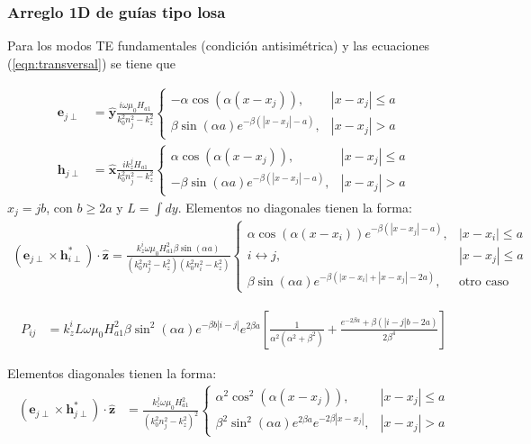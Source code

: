 \subsubsection{Arreglo 1D de guías tipo losa}
Para los modos TE fundamentales (condición antisimétrica) y las ecuaciones (\ref{eqn:transversal}) se tiene que

\begin{align}
	\textbf{e}_{j\perp} &= \hat{\textbf{y}}\frac{i\omega\mu_0 H_{a1}}{k_0^2n_j^2 - k_z^2}\left\{ \begin{matrix}
-\alpha \cos(\alpha (x-x_j)), &|x-x_j|\le a
\\
\beta\sin(\alpha a) e^{-\beta(|x-x_j|-a)}, &|x-x_j| > a
\end{matrix}\right.
\\
\textbf{h}_{j\perp} &= \hat{\textbf{x}}\frac{ik_z^j H_{a1}}{k_0^2n_j^2 - k_z^2}\left\{ \begin{matrix}
\alpha \cos(\alpha (x-x_j)), &|x-x_j|\le a
\\
-\beta\sin(\alpha a) e^{-\beta(|x-x_j|-a)}, &|x-x_j| > a
\end{matrix}\right.
\end{align}
$x_j=jb$, con $b\ge 2a$ y $L=\int dy$. Elementos no diagonales tienen la forma:
\begin{align}
	\left(\textbf{e}_{j\perp}\times\textbf{h}_{i\perp}^*\right)\cdot \hat{\textbf{z}}
	=
	\frac{k_z^i \omega \mu_0 H_{a1}^2 \beta\sin(\alpha a)}{(k_0^2n_j^2 - k_z^2)(k_0^2n_i^2 - k_z^2)}
	\left\{
	\begin{matrix}
		 \alpha\cos(\alpha(x-x_i))e^{-\beta(|x-x_j|-a)}, & |x-x_i| \le a
		\\
		i \leftrightarrow j, & |x-x_j| \le a
		\\
		\beta \sin(\alpha a)e^{-\beta (|x-x_i|+|x-x_j|-2a)}, & \text{otro caso}
	\end{matrix}
	\right.
\end{align}

\begin{align*}
	P_{ij} &= k_z^i L \omega \mu_0 H_{a1}^2 \beta\sin^2(\alpha a)e^{-\beta b |i-j|} e^{2\beta a} \left[\frac{1}{\alpha^2(\alpha^2+\beta^2)} + \frac{e^{-2\beta a}+\beta\left(|i-j|b-2a\right)}{2\beta^4} \right]			
\end{align*}

Elementos diagonales tienen la forma:
\begin{align*}
	\left(\textbf{e}_{j\perp}\times\textbf{h}_{j\perp}^*\right)\cdot \hat{\textbf{z}}&=\frac{k_z^j\omega\mu_0 H_{a1}^2}{(k_0^2n_j^2-k_z^2)^2} \left\{ \begin{matrix}
\alpha^2\cos^2(\alpha (x-x_j)), & |x-x_j| \le a
\\
\beta^2 \sin^2(\alpha a) e^{2\beta a} e^{-2\beta|x-x_j|}, & |x-x_j|>a
\end{matrix}\right.
\end{align*}



